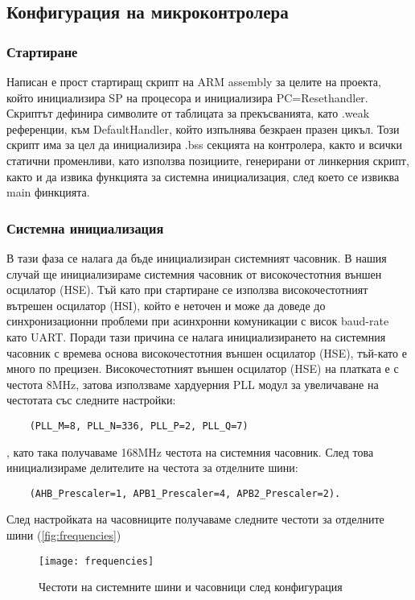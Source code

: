 \subsection{Конфигурация на микроконтролера}

\subsubsection{Стартиране }

Написан е прост стартиращ скрипт на ARM assembly за целите на проекта, който инициализира SP на процесора и инициализира PC=Resethandler.
Скриптът дефинира символите от таблицата за прекъсванията, като .weak референции, към DefaultHandler, който изпълнява безкраен празен цикъл.
Този скрипт има за цел да инициализира .bss секцията на контролера,
както и всички статични променливи, като използва позициите, генерирани от линкерния скрипт, както и да извика функцията за системна инициализация, след което се извиква main финкцията.

\subsubsection{Системна инициализация}

В тази фаза се налага да бъде инициализиран системният часовник.
В нашия случай ще инициализираме системния часовник от високочестотния външен осцилатор (HSE). 
Тъй като при стартиране се използва високочестотният вътрешен осцилатор (HSI), който е
неточен и може да доведе до синхронизационни проблеми при асинхронни комуникации 
с висок baud-rate като UART.
Поради тази причина се налага инициализирането на системния часовник с времева основа
високочестотния външен осцилатор (HSE), тъй-като е много по прецизен.
Високочестотният външен осцилатор (HSE) на платката е с честота 8MHz, затова използваме
хардуерния PLL модул за увеличаване на честотата със следните настройки:
\begin{verbatim}
    (PLL_M=8, PLL_N=336, PLL_P=2, PLL_Q=7)
\end{verbatim}
, като така получаваме  168MHz честота на системния часовник.
След това инициализираме делителите на честота за отделните шини:
\begin{verbatim}
    (AHB_Prescaler=1, APB1_Prescaler=4, APB2_Prescaler=2).
\end{verbatim}
След настройката на часовниците получаваме следните честоти за отделните шини (\autoref{fig:frequencies})

\begin{figure}[htpb!]
    \centering
    \texttt{[image: frequencies]}
    \caption{Честоти на системните шини и часовници след конфигурация}
    \label{fig:frequencies}
\end{figure}

